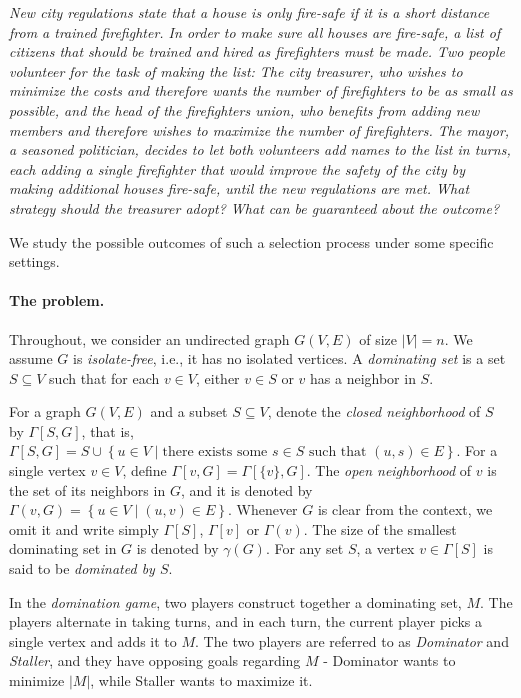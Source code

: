\documentclass[11pt]{article}
\theoremstyle{definition}
\begin{document}
{\em New city regulations state that a house is only fire-safe if it is a short distance from a trained firefighter.
In order to make sure all houses are fire-safe, a list of citizens that should be trained and hired as firefighters must be made.
Two people volunteer for the task of making the list:
The city treasurer, who wishes to minimize the costs and therefore wants the number of firefighters to be as small as possible,
and 
the head of the firefighters union, who benefits from adding new members and therefore wishes to maximize the number of firefighters.
The mayor, a seasoned politician, decides to let both volunteers add names to the list 
in turns, each adding a single firefighter that would improve the safety of the city by making additional houses fire-safe, until the new regulations are met.
What strategy should the treasurer adopt? What can be guaranteed about the outcome?
}

We study the possible outcomes of such a selection process under some specific settings.

\paragraph{The problem.}
Throughout, we consider an undirected graph $G(V,E)$ of size $|V|=n$.
We assume $G$ is \emph{isolate-free}, i.e., it has no isolated vertices.
A \emph{dominating set} is a set $S \subseteq V$ such that for each $v\in V$, either $v \in S$ or $v$ has a neighbor in $S$.

For a graph $G(V,E)$ and a subset $S \subseteq V$, denote the \emph{closed neighborhood} of $S$ by $\Gamma[S, G]$, that is,
$\Gamma[S, G] = S \cup \left\{ u \in V \mid  \mbox{there exists some } s \in S \mbox{ such that } (u, s) \in E \right\}$. 
For a single vertex $v \in V$, define 
$\Gamma[v, G] = \Gamma[\{v\}, G]$.
The \emph{open neighborhood} of $v$ is the set of its neighbors in $G$, and it is denoted by $\Gamma(v, G) = \left\{ u \in V \mid  (u, v) \in E \right\}$.
Whenever $G$ is clear from the context, we omit it and write simply $\Gamma[S]$, $\Gamma[v]$ or $\Gamma(v)$.
The size of the smallest dominating set in $G$ is denoted by $\gamma(G)$.
For any set $S$, a vertex $v \in \Gamma[S]$ is said to be \emph{dominated by $S$}.

In the \emph{domination game}, two players construct together a dominating set, $M$. 
The players alternate in taking turns, and in each turn, the current player picks a single vertex and adds it to $M$.
The two players are referred to as \emph{Dominator} and \emph{Staller}, and they have opposing goals regarding $M$ - Dominator wants to minimize $|M|$, while Staller wants to maximize it.
\end{document}
